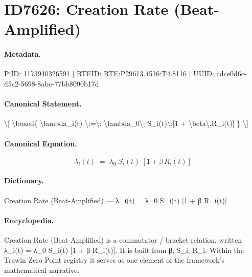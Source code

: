 \section*{ID7626: Creation Rate (Beat-Amplified)}
\paragraph{Metadata.}
PiID: 1173940326591 | RTEID: RTE:P29613.4516:T4.8116 | UUID: cdce0d6c-d5c2-5698-8abc-77bb8090b17d

\paragraph{Canonical Statement.}
\textbackslash{}[ \textbackslash{}boxed\{ \textbackslash{}lambda\_i(t) \textbackslash{};=\textbackslash{}; \textbackslash{}lambda\_0\textbackslash{}; S\_i(t)\textbackslash{};[1 + \textbackslash{}beta\textbackslash{},R\_i(t)] \} \textbackslash{}]

\paragraph{Canonical Equation.}
\[
\boxed{ \lambda_i(t) \;=\; \lambda_0\; S_i(t)\;[1 + \beta\,R_i(t)] }
\]

\paragraph{Dictionary.}
Creation Rate (Beat-Amplified) — λ\_i(t) = λ\_0 S\_i(t) [1 + β R\_i(t)]

\paragraph{Encyclopedia.}
Creation Rate (Beat-Amplified) is a commutator / bracket relation, written λ\_i(t) = λ\_0 S\_i(t) [1 + β R\_i(t)]. It is built from β, S\_i, R\_i. Within the Trawin Zero Point registry it serves as one element of the framework's mathematical narrative.
